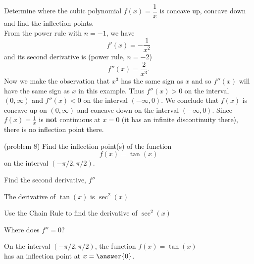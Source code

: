 \documentclass[handout]{ximera}
\begin{document}
\begin{example}[example 8]
Determine where the cubic polynomial $f(x) = \dfrac{1}{x}$ is concave up, concave down and 
find the inflection points.\\
From the power rule with $n = -1$, we have 
\[
f'(x) = -\frac{1}{x^2}
\]
and its second derivative is (power rule, $n = -2$)
\[
f''(x) = \frac{2}{x^3}.
\]
Now we make the observation that $x^3$ has the same sign as $x$ and so $f''(x)$ will have 
the same sign as $x$
in this example. Thus $f''(x) > 0$ on the interval $(0, \infty)$ and $f''(x) < 0$ on the 
interval $(-\infty,0).$
We conclude that $f(x)$ is concave up on $(0, \infty)$ and concave down on the 
interval $(-\infty, 0).$ 
Since $f(x) = \frac{1}{x}$ is \textbf{not} continuous at $x=0$ (it has an infinite 
discontinuity there), 
there is no inflection point there.  

\end{example}


\begin{problem}(problem 8)
  Find the inflection point(s) of the function
  \[
     f(x) = \tan(x)
  \]
	on the interval $(-\pi/2, \pi/2)$.\\
  
    \begin{hint}
      Find the second derivative, $f''$
    \end{hint}
    \begin{hint}
      The derivative of $\tan(x)$ is $\sec^2(x)$
    \end{hint}
		\begin{hint}
      Use the Chain Rule to find the derivative of $\sec^2(x)$
    \end{hint}
		\begin{hint}
      Where does $f'' = 0$?
    \end{hint}
	On the interval $(-\pi/2, \pi/2)$, the function $f(x) = \tan(x)$ \\
	has an inflection point at $x =\answer{0}$.
 
\end{problem}
\end{document}
